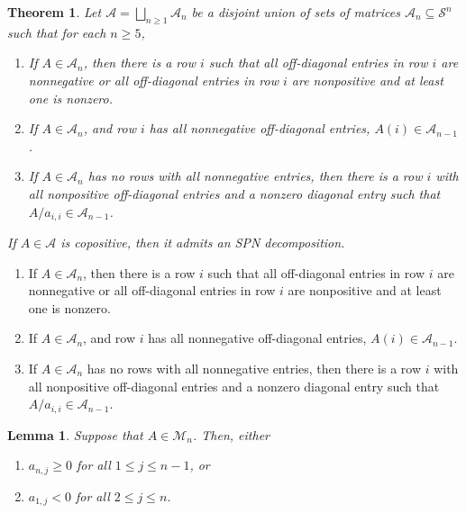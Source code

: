 \documentclass[10pt,a4paper]{amsart}
\newtheorem{theorem}{Theorem}
\newtheorem{lemma}{Lemma}
\newcommand{\cA}{\mathcal{A}}
\newcommand{\cS}{\mathcal{S}}
\begin{document}
\begin{theorem}\label{thm:MainTheoremGeneral}
Let $\cA = \bigsqcup_{n \geq 1}\cA_n$ be a disjoint union of sets of matrices $\cA_n \subseteq \cS^n$ such that for each $n \geq 5$,

\begin{enumerate}[label = (\ref{thm:MainTheoremGeneral}.\Roman*), ref = (\ref{thm:MainTheoremGeneral}.\Roman*)]
\item\label{itm:GenTheoremUniformRow} If $A \in \cA_n$, then there is a row $i$ such that all off-diagonal entries in row $i$ are nonnegative or all off-diagonal entries in row $i$ are nonpositive and at least one is nonzero.
\item\label{itm:GenTheoremDeleteNonneg} If $A \in \cA_n$, and row $i$ has all nonnegative off-diagonal entries, $A(i) \in \cA_{n-1}$.
\item\label{itm:GenTheoremSchur} If $A \in \cA_n$ has no rows with all nonnegative entries, then there is a row $i$ with all nonpositive off-diagonal entries and a nonzero diagonal entry such that $A/a_{i,i} \in \cA_{n-1}$. 
\end{enumerate}

If $A \in \cA$ is copositive, then it admits an SPN decomposition. 
\end{theorem}

\begin{enumerate}[label = (\ref{thm:MainTheoremGeneral}.\Roman*), ref = (\ref{thm:MainTheoremGeneral}.\Roman*)]
\item If $A \in \cA_n$, then there is a row $i$ such that all off-diagonal entries in row $i$ are nonnegative or all off-diagonal entries in row $i$ are nonpositive and at least one is nonzero.
\item If $A \in \cA_n$, and row $i$ has all nonnegative off-diagonal entries, $A(i) \in \cA_{n-1}$.
\item If $A \in \cA_n$ has no rows with all nonnegative entries, then there is a row $i$ with all nonpositive off-diagonal entries and a nonzero diagonal entry such that $A/a_{i,i} \in \cA_{n-1}$. 
\end{enumerate}

\begin{lemma}\label{lem:Uniform_Row}
Suppose that $A\in \mathcal{M}_n$. Then, either 

\begin{enumerate}
\item $a_{n,j}\geq 0$ for all $1 \leq j \leq n-1$, or 
\item $a_{1,j} < 0$ for all $2\leq j \leq n$. 
\end{enumerate}
\end{lemma}
\end{document}
